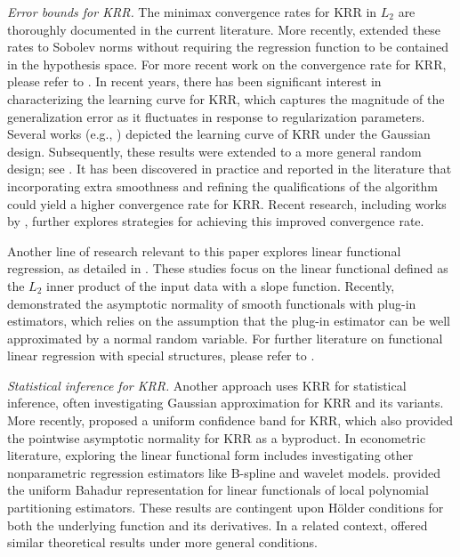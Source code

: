 \documentclass[12pt]{article}
\theoremstyle{plain}
\theoremstyle{remark}
\begin{document}
\textit{Error bounds for KRR.} The minimax convergence rates for KRR in $L_2$  are thoroughly documented in the current literature. More recently, \cite{fischer2020sobolev} extended these rates to Sobolev norms without requiring the regression function to be contained in the hypothesis space.  For more recent work on the convergence rate for KRR, please refer to \cite{yang2017frequentist, wang2021inference, cui2021generalization, marteau2019beyond, talwai2022sobolev, zhang2023optimality}. In recent years, there has been significant interest in characterizing the learning curve for KRR, which captures the magnitude of the generalization error as it fluctuates in response to regularization parameters. Several works (e.g., \cite{bordelon2020spectrum, cui2021generalization}) depicted the learning curve of KRR under the Gaussian design. Subsequently, these results were extended to a more general random design; see \cite{ loureiro2021learning}. It has been discovered in practice and reported in the literature \citep{bauer2007regularization,gerfo2008spectral} that incorporating extra smoothness and refining the qualifications of the algorithm could yield a higher convergence rate for KRR. Recent research, including works by \citet{dicker2017kernel, li2022saturation, lian2021distributed, lin2020optimal, tuo2020improved}, further explores strategies for achieving this improved convergence rate.


Another line of research relevant to this paper explores linear functional regression, as detailed in \citep{li2020inference, lv2023kernel, sun2018optimal}. These studies focus on the linear functional defined as the 
$L_2$ inner product of the input data with a slope function. Recently, \cite{koltchinskii2023functional} demonstrated the asymptotic normality of smooth functionals with plug-in estimators, which relies on the assumption that the plug-in estimator can be well approximated by a normal random variable. For further literature on functional linear regression with special structures, please refer to \citep{cui2020partially, balasubramanian2022unified}.




\textit{Statistical inference for KRR.}  Another approach uses KRR for statistical inference, often investigating Gaussian approximation for KRR and its variants. More recently,  \cite{singhkernel} proposed a uniform confidence band for KRR, which also provided the pointwise asymptotic normality for KRR as a byproduct.  In econometric literature, exploring the linear functional form includes investigating other nonparametric regression estimators like B-spline and wavelet models.  \cite{cattaneo2013optimal} provided the uniform Bahadur representation for linear functionals of local polynomial partitioning estimators. These results are contingent upon H\"older conditions for both the underlying function and its derivatives. In a related context, \citep{belloni2015some,chen2015optimal} offered similar theoretical results under more general conditions. 
\end{document}
